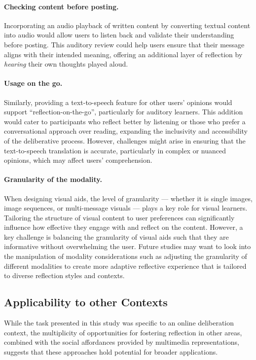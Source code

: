 \paragraph{Checking content before posting.} Incorporating an audio playback of written content by converting textual content into audio would allow users to listen back and validate their understanding before posting. This auditory review could help users ensure that their message aligns with their intended meaning, offering an additional layer of reflection by \textit{hearing} their own thoughts played aloud. 

\paragraph{Usage on the go.} Similarly, providing a text-to-speech feature for other users' opinions would support ``reflection-on-the-go'', particularly for auditory learners. This addition would cater to participants who reflect better by listening or those who prefer a conversational approach over reading, expanding the inclusivity and accessibility of the deliberative process. However, challenges might arise in ensuring that the text-to-speech translation is accurate, particularly in complex or nuanced opinions, which may affect users' comprehension.%

\paragraph{Granularity of the modality.} When designing visual aids, the level of granularity --- whether it is single images, image sequences, or multi-message visuals --- plays a key role for visual learners. Tailoring the structure of visual content to user preferences can significantly influence how effective they engage with and reflect on the content. However, a key challenge is balancing the granularity of visual aids such that they are informative without overwhelming the user. Future studies may want to look into the manipulation of modality considerations such as adjusting the granularity of different modalities to create more adaptive reflective experience that is tailored to diverse reflection styles and contexts.

\subsection{Applicability to other Contexts}
While the task presented in this study was specific to an online deliberation context, the multiplicity of opportunities for fostering reflection in other areas, combined with the social affordances provided by multimedia representations, suggests that these approaches hold potential for broader applications. 


